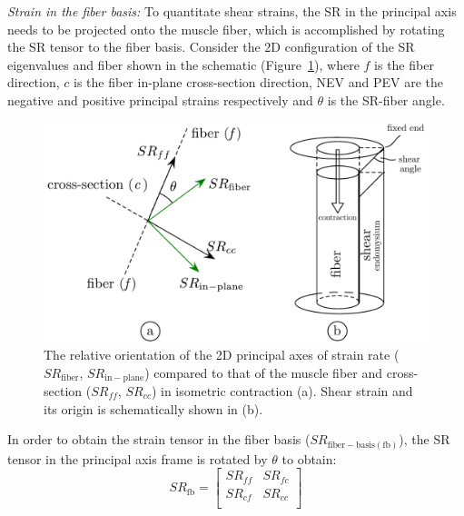 \textit{Strain in the fiber basis:}
To quantitate shear strains, the SR in the principal axis needs to be projected onto the muscle fiber, which is accomplished by rotating the SR tensor to the fiber basis. 
Consider the 2D configuration of the SR eigenvalues and fiber shown in the schematic (Figure~\ref{fig: SR1_1}), where $f$ is the fiber direction, $c$ is the fiber in-plane cross-section direction, NEV and PEV are the negative and positive principal strains respectively and $\theta$ is the SR-fiber angle. 
\begin{figure}[!htb]
\vspace{+0.2cm}
\centering
\includegraphics[scale=0.62]{Figures/SR2dSchematic.pdf}
\caption[Schematic of strain rate in principal axes and shear strain in muscle during isometric contraction.]{The relative orientation of the 2D principal axes of strain rate ($SR_\mathrm{fiber}$, $SR_\mathrm{in-plane}$) compared to that of the muscle fiber and cross-section ($SR_{ff}$, $SR_{cc}$) in isometric contraction (a). Shear strain and its origin is schematically shown in (b).}
\label{fig: SR1_1}
\end{figure}
In order to obtain the strain tensor in the fiber basis ($SR_{\mathrm{fiber-basis(fb)}}$), the SR tensor in the principal axis frame is rotated by $\theta$ to obtain:
\begin{equation}\label{eq: SR fiber basis}
SR_{\mathrm{fb}} = \left [
\begin{matrix}
SR_{ff} & SR_{fc}\\
SR_{cf} & SR_{cc}\\
\end{matrix} \right]
\end{equation}
